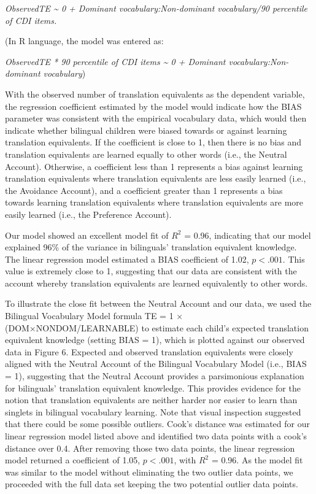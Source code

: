 \documentclass[
  english,
  ,man,floatsintext]{apa6}
\begin{document}
\emph{ObservedTE \textasciitilde{} 0 + Dominant vocabulary:Non-dominant vocabulary/90 percentile of CDI items.}

\noindent (In R language, the model was entered as:

\emph{ObservedTE * 90 percentile of CDI items \textasciitilde{} 0 + Dominant vocabulary:Non-dominant vocabulary})

\noindent With the observed number of translation equivalents as the dependent variable, the regression coefficient estimated by the model would indicate how the BIAS parameter was consistent with the empirical vocabulary data, which would then indicate whether bilingual children were biased towards or against learning translation equivalents. If the coefficient is close to 1, then there is no bias and translation equivalents are learned equally to other words (i.e., the Neutral Account). Otherwise, a coefficient less than 1 represents a bias against learning translation equivalents where translation equivalents are less easily learned (i.e., the Avoidance Account), and a coefficient greater than 1 represents a bias towards learning translation equivalents where translation equivalents are more easily learned (i.e., the Preference Account).

Our model showed an excellent model fit of \(R^2\) = 0.96, indicating that our model explained 96\% of the variance in bilinguals' translation equivalent knowledge. The linear regression model estimated a BIAS coefficient of 1.02, \(p < .001\). This value is extremely close to 1, suggesting that our data are consistent with the account whereby translation equivalents are learned equivalently to other words.

To illustrate the close fit between the Neutral Account and our data, we used the Bilingual Vocabulary Model formula TE = 1 × (DOM×NONDOM/LEARNABLE) to estimate each child's expected translation equivalent knowledge (setting BIAS = 1), which is plotted against our observed data in Figure 6. Expected and observed translation equivalents were closely aligned with the Neutral Account of the Bilingual Vocabulary Model (i.e., BIAS = 1), suggesting that the Neutral Account provides a parsimonious explanation for bilinguals' translation equivalent knowledge. This provides evidence for the notion that translation equivalents are neither harder nor easier to learn than singlets in bilingual vocabulary learning. Note that visual inspection suggested that there could be some possible outliers. Cook's distance was estimated for our linear regression model listed above and identified two data points with a cook's distance over 0.4. After removing those two data points, the linear regression model returned a coefficient of 1.05, \(p < .001\), with \(R^2\) = 0.96. As the model fit was similar to the model without eliminating the two outlier data points, we proceeded with the full data set keeping the two potential outlier data points.
\end{document}
